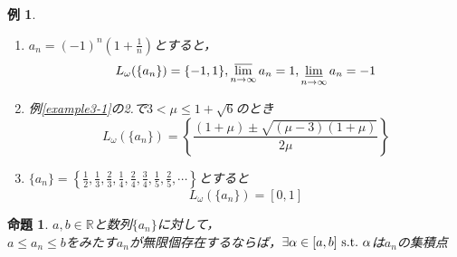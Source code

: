\documentclass[dvipdfmx,a4j,10pt]{jsarticle}
\theoremstyle{mystyle1}
\newtheorem{prop}[dfn]{命題}
\newtheorem{example}[dfn]{例}
\theoremstyle{mystyle2}
\begin{document}
\begin{example}\
    \begin{enumerate}
    \item $\displaystyle a_{n}=(-1)^n\left(1+\frac{1}{n}\right)$とすると，
    	\[L_\omega(\{a_n\})=\{-1,1\},\varlimsup_{n\to\infty}a_n=1,\varliminf_{n\to\infty}a_n=-1\]
    \item 例\ref{example3-1}の2.で$3<\mu\leq1+\sqrt{6}$のとき
    	\[L_\omega(\{a_n\})=\left\{\frac{(1+\mu)\pm\sqrt{(\mu-3)(1+\mu)}}{2\mu}\right\}\]
    	\item $\displaystyle \{a_n\}=\left\{\frac{1}{2},\frac{1}{3},\frac{2}{3},\frac{1}{4},\frac{2}{4},\frac{3}{4},\frac{1}{5},\frac{2}{5},\cdots\right\}$とすると
    	\[L_\omega(\{a_n\})=[0,1]\]
    \end{enumerate}
\end{example}

\newpage

\begin{framed}
\begin{prop}\label{prop2}
$a,b\in\mathbb{R}$と数列$\{a_n\}$に対して，\\$a\leq a_n\leq b$をみたす$a_n$が無限個存在するならば，$\exists\alpha\in[a,b]\ {\rm s.t.}\ \alpha$は$a_n$の集積点
\end{prop}
\end{framed}
\end{document}
